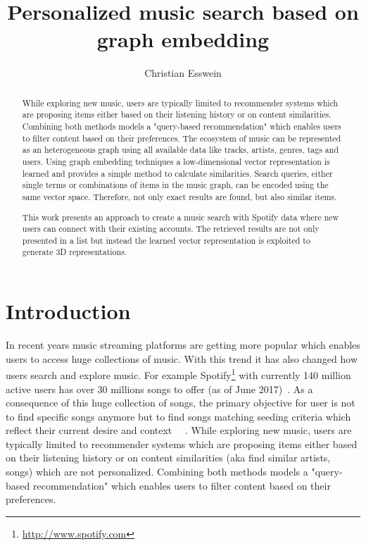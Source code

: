 \documentclass[sigconf]{acmart}
\begin{document}
\title{Personalized music search based on graph embedding}


\author{Christian Esswein}



\begin{abstract}
	While exploring new music, users are typically limited to recommender systems which are proposing items either based on their listening history or on content similarities. Combining both methods models a "query-based recommendation" which enables users to filter content based on their preferences.
	The ecosystem of music can be represented as an heterogeneous graph using all available data like tracks, artists, genres, tags and users. Using graph embedding techniques a low-dimensional vector representation is learned and provides a simple method to calculate similarities. Search queries, either single terms or combinations of items in the music graph, can be encoded using the same vector space. Therefore, not only exact results are found, but also similar items.
	
	This work presents an approach to create a music search with Spotify data where new users can connect with their existing accounts. The retrieved results are not only presented in a list but instead the learned vector representation is exploited to generate 3D representations.
\end{abstract}



\maketitle

\section{Introduction}
In recent years music streaming platforms are getting more popular which enables users to access huge collections of music. With this trend it has also changed how users search and explore music. For example Spotify\footnote{\url{http://www.spotify.com}} with currently 140 million active users has over 30 millions songs to offer (as of June 2017)~\cite{aboutSpotify}. As a consequence of this huge collection of songs, the primary objective for user is not to find specific songs anymore but to find songs matching seeding criteria which reflect their current desire and context ~\cite{lee2016look}~\cite{kamalzadeh2012survey}. 
While exploring new music, users are typically limited to recommender systems which are proposing items either based on their listening history or on content similarities (aka find similar artists, songs) which are not personalized. Combining both methods models a "query-based recommendation" which enables users to filter content based on their preferences.
\end{document}
